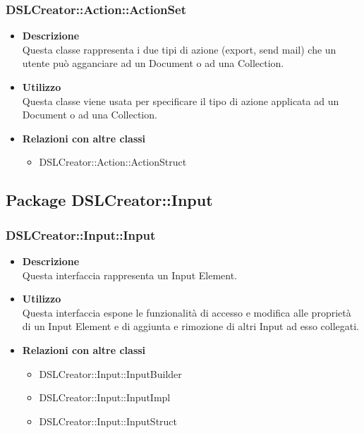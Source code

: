  \subsubsection{DSLCreator::Action::ActionSet}
                    \begin{itemize}
                        \item \textbf{Descrizione} \hfill \\
                          Questa classe rappresenta i due tipi di azione (export, send mail) che un utente può agganciare ad un Document o ad una Collection.
                        \item \textbf{Utilizzo} \hfill \\
                          Questa classe viene usata per specificare il tipo di azione applicata ad un Document o ad una Collection.
                        \item \textbf{Relazioni con altre classi}
                            \begin{itemize}
                              \item DSLCreator::Action::ActionStruct
                            \end{itemize}
                    \end{itemize}  

\subsection{Package DSLCreator::Input}
 \subsubsection{DSLCreator::Input::Input}
                    \begin{itemize}
                        \item \textbf{Descrizione} \hfill \\
                          Questa interfaccia rappresenta un Input Element.
                        \item \textbf{Utilizzo} \hfill \\
                          Questa interfaccia espone le funzionalità di accesso e modifica alle proprietà di un Input Element e di aggiunta e rimozione di altri Input ad esso collegati.
                        \item \textbf{Relazioni con altre classi}
                            \begin{itemize}
                              \item DSLCreator::Input::InputBuilder
                              \item DSLCreator::Input::InputImpl
                              \item DSLCreator::Input::InputStruct
                            \end{itemize}
                    \end{itemize}  

